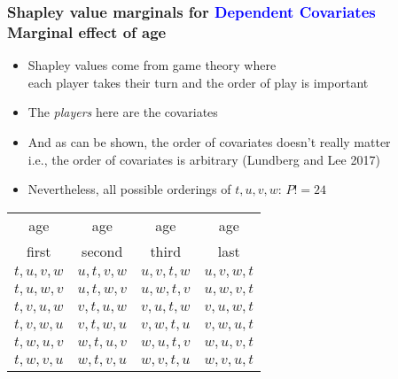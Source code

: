\documentclass[11pt,dvipsnames,usenames,times]{beamer}
\newcommand*{\blue}[1]{\textcolor{blue}{#1}}%
\begin{document}
\begin{frame}
\frametitle{Shapley value marginals for \blue{Dependent Covariates}\\
Marginal effect of age}

\begin{itemize}
\item Shapley values come from game theory where\\ 
each player takes their turn and the order of play is important
\item The {\it players} here are the covariates
\item And as can be shown, the order of covariates doesn't really matter\\
i.e., the order of covariates is arbitrary (Lundberg and Lee 2017)
\item Nevertheless, all possible orderings of $t,u,v,w$: $P! = 24$
\end{itemize}
\begin{center}
\begin{tabular}{llll}
\multicolumn{1}{c}{age} & \multicolumn{1}{c}{age} & 
\multicolumn{1}{c}{age} & \multicolumn{1}{c}{age} \\
\multicolumn{1}{c}{first} & \multicolumn{1}{c}{second} & 
\multicolumn{1}{c}{third} & \multicolumn{1}{c}{last} \\
$t,u,v,w$ & $u,t,v,w$ & $u,v,t,w$ & $u,v,w,t$ \\
$t,u,w,v$ & $u,t,w,v$ & $u,w,t,v$ & $u,w,v,t$ \\
$t,v,u,w$ & $v,t,u,w$ & $v,u,t,w$ & $v,u,w,t$ \\
$t,v,w,u$ & $v,t,w,u$ & $v,w,t,u$ & $v,w,u,t$ \\
$t,w,u,v$ & $w,t,u,v$ & $w,u,t,v$ & $w,u,v,t$ \\
$t,w,v,u$ & $w,t,v,u$ & $w,v,t,u$ & $w,v,u,t$ \\
\end{tabular}
\end{center}
\end{frame} 
\end{document}
